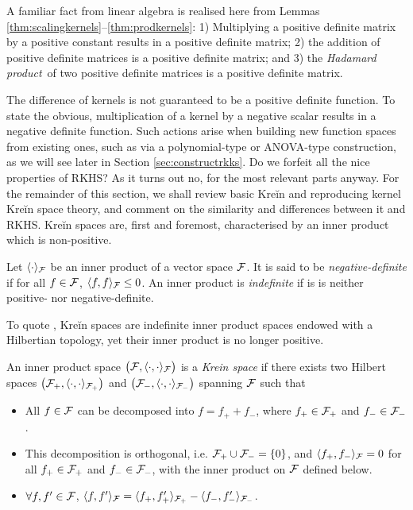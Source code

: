 A familiar fact from linear algebra is realised here from Lemmas \ref{thm:scalingkernels}--\ref{thm:prodkernels}: 
1) Multiplying a positive definite matrix by a positive constant results in a positive definite matrix; 
2) the addition of positive definite matrices is a positive definite matrix; and 
3) the \emph{Hadamard product}\footnotemark~of two positive definite matrices is a positive definite matrix.

The difference of kernels is not guaranteed to be a positive definite function.
To state the obvious, multiplication of a kernel by a negative scalar results in a negative definite function.
Such actions arise when building new function spaces from existing ones, such as via a polynomial-type or ANOVA-type construction, as we will see later in Section \ref{sec:constructrkks}.
Do we forfeit all the nice properties of RKHS?
As it turns out no, for the most relevant parts anyway.
For the remainder of this section, we shall review basic Kreĭn and reproducing kernel Kreĭn space theory, and comment on the similarity and differences between it and RKHS.
Kreĭn spaces are, first and foremost, characterised by an inner product which is non-positive.

\begin{definition}
  Let $\langle\cdot\rangle_{\mathcal F}$ be an inner product of a vector space ${\mathcal F}$.
  It is said to be \emph{negative-definite} if for all $f\in{\mathcal F}$, $\langle f,f\rangle_{\mathcal F} \leq 0$.
  An inner product is \emph{indefinite} if is is neither positive- nor negative-definite.
\end{definition}

To quote \citet{ong2004learning}, Kreĭn spaces are indefinite inner product spaces endowed with a Hilbertian topology, yet their inner product is no longer positive. 

\begin{definition}
  An inner product space $\big({\mathcal F},\langle\cdot,\cdot\rangle_{\mathcal F}\big)$ is a \emph{Krein space} if there exists two Hilbert spaces $\big({\mathcal F}_+,\langle\cdot,\cdot\rangle_{{\mathcal F}_+}\big)$ and $\big({\mathcal F}_-,\langle\cdot,\cdot\rangle_{{\mathcal F}_-}\big)$ spanning ${\mathcal F}$ such that
  \begin{itemize}
    \item All $f\in{\mathcal F}$ can be decomposed into $f = f_+ + f_-$, where $f_+\in{\mathcal F}_+$ and $f_- \in {\mathcal F}_-$.
    \item This decomposition is orthogonal, i.e. ${\mathcal F}_+ \cup {\mathcal F}_- = \{0\}$, and $\langle f_+,f_-\rangle_{\mathcal F}=0$ for all $f_+\in{\mathcal F}_+$ and $f_-\in{\mathcal F}_-$, with the inner product on ${\mathcal F}$ defined below.
    \item $\forall f,f'\in{\mathcal F}$, $\langle f,f'\rangle_{\mathcal F} = \langle f_+,f_+'\rangle_{{\mathcal F}_+}- \langle f_-,f_-'\rangle_{{\mathcal F}_-}$.
  \end{itemize}
\end{definition}

